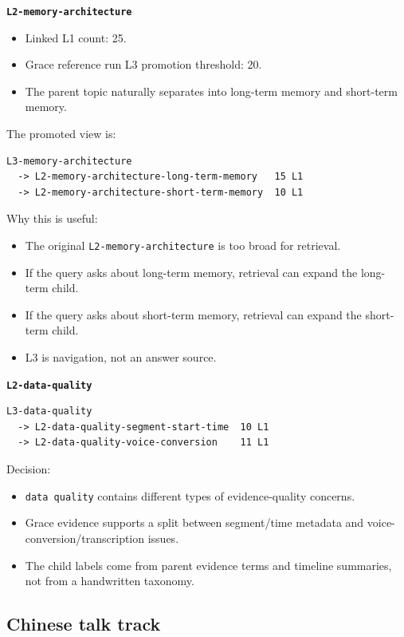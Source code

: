 \documentclass[11pt,a4paper]{article}
\newcommand{\code}[1]{{\footnotesize\texttt{#1}}}
\begin{document}
\textbf{\code{L2-memory-architecture}}

\begin{itemize}
  \item Linked L1 count: 25.
  \item Grace reference run L3 promotion threshold: 20.
  \item The parent topic naturally separates into long-term memory and short-term memory.
\end{itemize}

The promoted view is:

\begin{verbatim}
L3-memory-architecture
  -> L2-memory-architecture-long-term-memory   15 L1
  -> L2-memory-architecture-short-term-memory  10 L1
\end{verbatim}

Why this is useful:

\begin{itemize}
  \item The original \code{L2-memory-architecture} is too broad for retrieval.
  \item If the query asks about long-term memory, retrieval can expand the long-term child.
  \item If the query asks about short-term memory, retrieval can expand the short-term child.
  \item L3 is navigation, not an answer source.
\end{itemize}

\textbf{\code{L2-data-quality}}

\begin{verbatim}
L3-data-quality
  -> L2-data-quality-segment-start-time  10 L1
  -> L2-data-quality-voice-conversion    11 L1
\end{verbatim}

Decision:

\begin{itemize}
  \item \code{data quality} contains different types of evidence-quality concerns.
  \item Grace evidence supports a split between segment/time metadata and voice-conversion/transcription issues.
  \item The child labels come from parent evidence terms and timeline summaries, not from a handwritten taxonomy.
\end{itemize}

\subsection{Chinese talk track}
\end{document}
